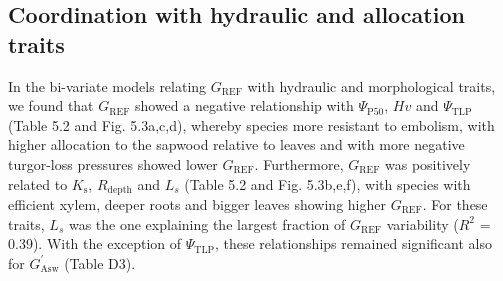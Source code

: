 \documentclass[11pt,twoside]{reedthesis}
\begin{document}
\subsection{Coordination with hydraulic and allocation
traits}\label{coordination-with-hydraulic-and-allocation-traits}

In the bi-variate models relating \(G_{\text{REF}}\) with hydraulic and
morphological traits, we found that \(G_{\text{REF}}\) showed a negative
relationship with \textbar{}\(\Psi_{\text{P50}}\)\textbar{}, \(Hv\) and
\textbar{}\(\Psi_{\text{TLP}}\)\textbar{} (Table 5.2 and Fig. 5.3a,c,d),
whereby species more resistant to embolism, with higher allocation to
the sapwood relative to leaves and with more negative turgor-loss
pressures showed lower \(G_{\text{REF}}\). Furthermore,
\(G_{\text{REF}}\) was positively related to \(K_\text{s}\),
\(R_{\text{depth}}\) and \(L_s\) (Table 5.2 and Fig. 5.3b,e,f), with
species with efficient xylem, deeper roots and bigger leaves showing
higher \(G_{\text{REF}}\). For these traits, \(L_s\) was the one
explaining the largest fraction of \(G_{\text{REF}}\) variability
(\(R^2\) = 0.39). With the exception of \(\Psi_{\text{TLP}}\), these
relationships remained significant also for \(G_{\text{Asw}}^{'}\)
(Table D3).\par
\end{document}
